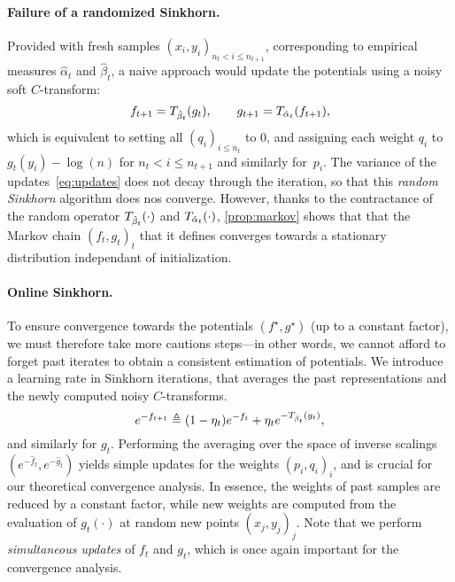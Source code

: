 \paragraph{Failure of a randomized Sinkhorn.}

Provided with fresh samples $(x_i, y_i)_{n_t < i \leq n_{t+1}}$, 
corresponding to empirical measures $\hat \alpha_t$ and $\hat \beta_t$, a naive approach would 
 update the potentials using a noisy soft $C$-transform:
\begin{equation}\label{eq:updates}
     f_{t+1} = \Ctrans{g_t}{\hat \beta_t},
    \qquad g_{t+1} = \Ctrans{f_{t+1}}{\hat \alpha_t},
\end{equation}
which is equivalent to setting all $(q_i)_{i \leq n_t}$ to $0$, and assigning each weight
 $q_i$ to $g_t(y_i) - \log(n)$ for $n_t < i \leq  n_{t+1}$ and similarly for~$p_i$.
%
The variance of the updates~\eqref{eq:updates} does not decay through the iteration, so that this
\textit{random Sinkhorn} algorithm does nos converge. However, thanks to the contractance of the random operator $\Ctrans{\cdot}{\hat \beta_t}$ and $\Ctrans{\cdot}{\hat \alpha_t}$, \autoref{prop:markov} shows that that the Markov chain ${(f_t,
g_t)}_t$ that it defines converges towards a stationary distribution independant
of initialization.

\paragraph{Online Sinkhorn.}

To ensure convergence towards the potentials $(f^\star, g^\star)$ (up to a
constant factor), we must therefore take more cautions steps---in other words,
we cannot afford to forget past iterates to obtain a consistent estimation of
potentials. We introduce a learning rate in Sinkhorn iterations, that averages
the past representations and the newly computed noisy $C$-transforms.
\begin{equation}\label{eq:updates}
    e^{-f_{t+1}}
    \eqdef (1 - \eta_t) e^{-f_t} 
    + \eta_t 
    e^{-\Ctrans{g_t}{\hat \beta_t}},
\end{equation}
and similarly for $g_t$. Performing the averaging over the space of inverse scalings
$(e^{-\hat f_{t}},e^{-\hat g_{t}})$ yields simple updates for the weights
${(p_i,q_i)}_i$, and is crucial for our theoretical convergence analysis. In essence, the
weights of past samples are reduced by a constant factor, while new weights are
computed from the evaluation of $g_t(\cdot)$ at random new points ${(x_j, y_j)}_j$. Note that we
perform \textit{simultaneous updates} of $f_t$ and $g_t$, which is once again important for the convergence analysis.

